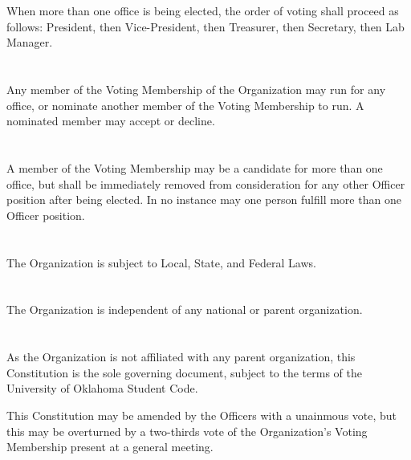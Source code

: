 \documentclass[12pt]{cls/constitution}
\begin{document}
\section{}
When more than one office is being elected, the order of voting shall proceed as follows: President, then Vice-President, then Treasurer, then Secretary, then Lab Manager.

\section{}
Any member of the Voting Membership of the Organization may run for any office, or nominate another member of the Voting Membership to run. A nominated member may accept or decline.

\section{}
A member of the Voting Membership may be a candidate for more than one office, but shall be immediately removed from consideration for any other Officer position after being elected. In no instance may one person fulfill more than one Officer position. 


\section{}
The Organization is subject to Local, State, and Federal Laws.

\section{}
The Organization is independent of any national or parent organization.

\section{}
As the Organization is not affiliated with any parent organization, this Constitution is the sole governing document, subject to the terms of the University of Oklahoma Student Code.

This Constitution may be amended by the Officers with a unainmous vote, but this may be overturned by a two-thirds vote of the Organization’s Voting Membership present at a general meeting. 
\end{document}
